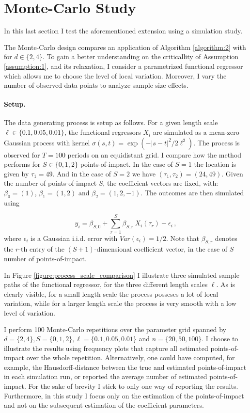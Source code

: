 \section{Monte-Carlo Study}
\label{section:monte_carlo}

In this last section I test the aforementioned extension using a simulation study.

The Monte-Carlo design compares an application of Algorithm \ref{algorithm:2} with for
$d \in \{2, 4\}$. To gain a better understanding on the criticallity of Assumption
\ref{assumption:1}, and its relaxation, I consider a parametrized functional regressor
which allows me to choose the level of local variation. Moreover, I vary the number of
observed data points to analyze sample size effects.

\paragraph{Setup.}

The data generating process is setup as follows. For a given length scale $\ell \in
\{0.1, 0.05, 0.01\}$, the functional regressors $X_i$ are simulated as a mean-zero
Gaussian process with kernel $\sigma(s, t) = \exp\left(-|s - t|^2 / 2 \ell^2\right)$.
The process is observed for $T=100$ periods on an equidistant grid. I compare how the
method performs for $S \in \{0, 1, 2\}$ points-of-impact. In the case of $S = 1$ the
location is given by $\tau_1 = 49$. And in the case of $S = 2$ we have $(\tau_1, \tau_2)
= (24, 49)$. Given the number of points-of-impact $S$, the coefficient vectors are
fixed, with: $\beta_0 = (1)$, $\beta_1 = (1, 2)$ and $\beta_2 = (1, 2, -1)$. The
outcomes are then simulated using

\[
    y_i = \beta_{S, 0} + \sum_{r = 1}^S \beta_{S, r} \, X_i(\tau_r) + \epsilon_i \,,
\]
where $\epsilon_i$ is a Gaussian i.i.d. error with $Var(\epsilon_i) = 1/2$. Note that
$\beta_{S, r}$ denotes the $r$-th entry of the $(S+1)$-dimensional coefficient vector,
in the case of $S$ number of points-of-impact.

In Figure \ref{figure:process_scale_comparison} I illustrate three simulated sample
paths of the functional regressor, for the three different length scales $\ell$. As is
clearly visible, for a small length scale the process posseses a lot of local variation,
while for a larger length scale the process is very smooth with a low level of
variation.

I perform 100 Monte-Carlo repetitions over the parameter grid spanned by $d = \{2, 4\},
S = \{0, 1, 2\}, \ell = \{0.1, 0.05, 0.01\}$ and $n = \{20, 50, 100\}$. I choose to
illustrate the results using frequency plots that capture all estimated points-of-impact
over the whole repetition. Alternatively, one could have computed, for example, the
Hausdorff-distance between the true and estimated points-of-impact in each simulation
run, or reported the average number of estimated points-of-impact. For the sake of
brevity I stick to only one way of reporting the results. Furthermore, in this study I
focus only on the estimation of the points-of-impact and not on the subsequent
estimation of the coefficient parameters.


